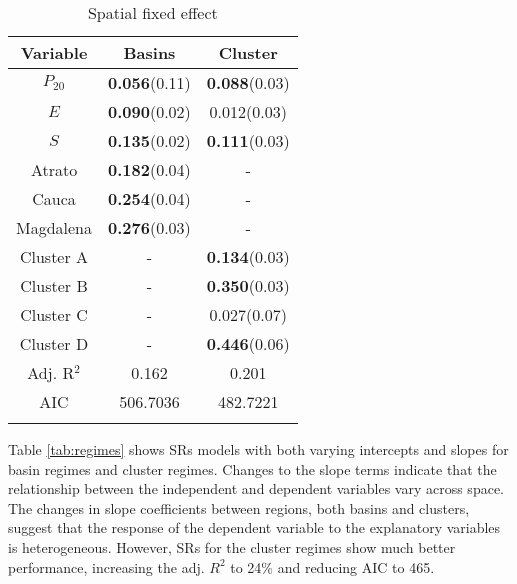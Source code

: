 \documentclass[
  manuscript=article,  
  layout=preprint,  
  year=2023,
  volume=0,
]{format}
\begin{document}
\begin{table}[htbp]\centering
\caption{Spatial fixed effect}
\label{tab:fixed}
\begin{tabular}{c c c}
\toprule
\textbf{Variable} & \textbf{Basins} & \textbf{Cluster} \\ 
\midrule
$P_{20}$&\textbf{0.056}(0.11)&\textbf{0.088}(0.03)\\
$E$&\textbf{0.090}(0.02)&0.012(0.03)\\
$S$&\textbf{0.135}(0.02)&\textbf{0.111}(0.03)\\
Atrato&\textbf{0.182}(0.04)&-\\
Cauca&\textbf{0.254}(0.04)&-\\
Magdalena&\textbf{0.276}(0.03)&-\\
Cluster A&-&\textbf{0.134}(0.03)\\
Cluster B&-&\textbf{0.350}(0.03)\\
Cluster C&-&0.027(0.07)\\
Cluster D&-&\textbf{0.446}(0.06)\\
\midrule
Adj. R$^{2}$&0.162&0.201\\
AIC&506.7036&482.7221\\
\bottomrule
\addlinespace[1ex]
\multicolumn{3}{l}{\textbf{$p<0.05$}}
\end{tabular}
\end{table}

\par Table \ref{tab:regimes} shows SRs models with both varying intercepts and slopes for basin regimes and cluster regimes. Changes to the slope terms indicate that the relationship between the independent and dependent variables vary across space. The changes in slope coefficients between regions, both basins and clusters, suggest that the response of the dependent variable to the explanatory variables is heterogeneous. However, SRs for the cluster regimes show much better performance, increasing the adj. $R^2$ to 24\% and reducing AIC to 465.
\end{document}
